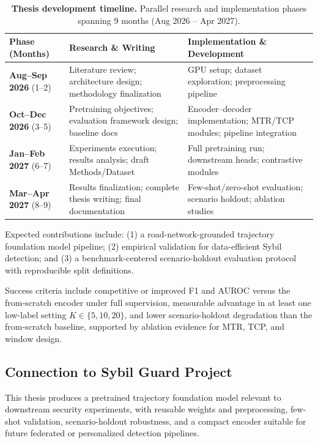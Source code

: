 \documentclass[12pt]{article}
\renewcommand{\arraystretch}{1.4}
\begin{document}
\begin{table}[H]
\centering
\small
\setlength{\tabcolsep}{6pt}
\renewcommand{\arraystretch}{1.4}
\begin{tabularx}{\textwidth}{|>{\RaggedRight\arraybackslash}p{2.35cm}|>{\RaggedRight\arraybackslash}X|>{\RaggedRight\arraybackslash}X|}
\hline
\textbf{Phase (Months)} & \textbf{Research \& Writing} & \textbf{Implementation \& Development} \\[0.5\baselineskip]\hline\hline
\textbf{Aug--Sep 2026} (1--2) & Literature review; architecture design; methodology finalization & GPU setup; dataset exploration; preprocessing pipeline \\[0.5\baselineskip]\hline
\textbf{Oct--Dec 2026} (3--5) & Pretraining objectives; evaluation framework design; baseline docs & Encoder--decoder implementation; MTR/TCP modules; pipeline integration \\[0.5\baselineskip]\hline
\textbf{Jan--Feb 2027} (6--7) & Experiments execution; results analysis; draft Methods/Dataset & Full pretraining run; downstream heads; contrastive modules \\[0.5\baselineskip]\hline
\textbf{Mar--Apr 2027} (8--9) & Results finalization; complete thesis writing; final documentation & Few-shot/zero-shot evaluation; scenario holdout; ablation studies \\[0.5\baselineskip]\hline
\end{tabularx}
\caption{\textbf{Thesis development timeline.} Parallel research and implementation phases spanning 9 months (Aug 2026 -- Apr 2027).}
\label{tab:timeline}
\end{table}

Expected contributions include: (1) a road-network-grounded trajectory foundation model pipeline; (2) empirical validation for data-efficient Sybil detection; and (3) a benchmark-centered scenario-holdout evaluation protocol with reproducible split definitions.

Success criteria include competitive or improved F1 and AUROC versus the from-scratch encoder under full supervision, measurable advantage in at least one low-label setting $K \in \{5, 10, 20\}$, and lower scenario-holdout degradation than the from-scratch baseline, supported by ablation evidence for MTR, TCP, and window design.

\subsection{Connection to Sybil Guard Project}

This thesis produces a pretrained trajectory foundation model relevant to downstream security experiments, with reusable weights and preprocessing, few-shot validation, scenario-holdout robustness, and a compact encoder suitable for future federated or personalized detection pipelines.

\clearpage
\begingroup
\renewcommand{\refname}{REFERENCES}
\singlespacing
\setlength{\parskip}{0.18em}


\endgroup
\end{document}
